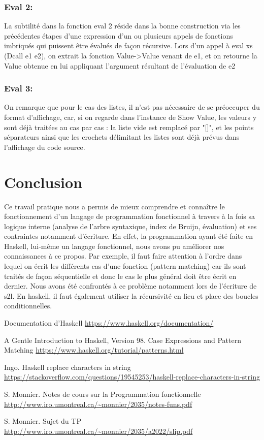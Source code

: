 \documentclass{article}
\begin{document}
\subsubsection{Eval 2:}
La subtilité dans la fonction eval 2 réside dans la bonne construction via les précédentes étapes d'une expression d'un ou plusieurs appels de fonctions imbriqués qui puissent être évalués de façon récursive.
Lors d'un appel à eval xs (Dcall e1 e2), on extrait la fonction Value->Value venant de e1, et on retourne la Value obtenue en lui appliquant l'argument résultant de l'évaluation de e2
\subsubsection{Eval 3:}
On remarque que pour le cas des listes, il n'est pas nécessaire de se préoccuper du format d'affichage, car, si on regarde dans l'instance de Show Value, les valeurs y sont déjà traitées au cas par cas : la liste vide est remplacé par "[]", et les points séparateurs ainsi que les crochets délimitant les listes sont déjà prévus dans l'affichage du code source.
\newpage
\section{Conclusion}
Ce travail pratique nous a permis de mieux comprendre et connaître le fonctionnement d'un langage de programmation fonctionnel à travers à la fois sa logique interne (analyse de l'arbre syntaxique, index de Bruijn, évaluation) et ses contraintes notamment d'écriture. En effet, la programmation ayant été faite en Haskell, lui-même un langage fonctionnel, nous avons pu améliorer nos connaissances à ce propos. Par exemple, il faut faire attention à l'ordre dans lequel on écrit les différents cas d'une fonction (pattern matching) car ils sont traités de façon séquentielle et donc le cas le plus général doit être écrit en dernier. Nous avons été confrontés à ce problème notamment lors de l'écriture de s2l.
En haskell, il faut également utiliser la récursivité en lieu et place des boucles conditionnelles.


\begin{thebibliography}{}
	
	Documentation d'Haskell
	\url{https://www.haskell.org/documentation/}
	
	A Gentle Introduction to Haskell, Version 98. Case Expressions and Pattern Matching
	\url{https://www.haskell.org/tutorial/patterns.html}
	
	Ingo. Haskell replace characters in string
	\url{https://stackoverflow.com/questions/19545253/haskell-replace-characters-in-string}
	
	S. Monnier. Notes de cours sur la Programmation fonctionnelle
	\url{http://www.iro.umontreal.ca/~monnier/2035/notes-funs.pdf}
	
	S. Monnier. Sujet du TP
	\url{http://www.iro.umontreal.ca/~monnier/2035/a2022/slip.pdf}
	
\end{thebibliography}
\end{document}

